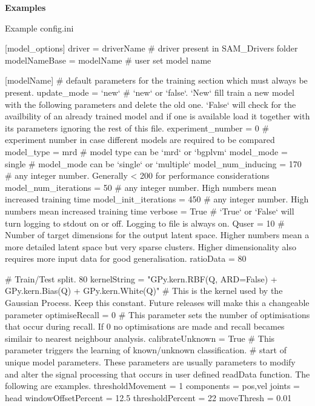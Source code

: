  {\bfseries Examples} 
\begin{DoxyCode}
Example config.ini

[model\_options]
driver = driverName \textcolor{comment}{# driver present in SAM\_Drivers folder}
modelNameBase = modelName \textcolor{comment}{# user set model name}

[modelName]
\textcolor{comment}{# default parameters for the training section which must always be present.}
update\_mode = `new` \textcolor{comment}{# `new` or `false`. `New` fill train a new model with the following parameters and
       delete the old one. `False` will check for the availbility of an already trained model and if one is available
       load it together with its parameters ignoring the rest of this file.}
experiment\_number = 0 \textcolor{comment}{# experiment number in case different models are required to be compared}
model\_type = mrd \textcolor{comment}{# model type can be `mrd` or `bgplvm`}
model\_mode = single \textcolor{comment}{# model\_mode can be `single` or `multiple`}
model\_num\_inducing = 170 \textcolor{comment}{# any integer number. Generally < 200 for performance considerations}
model\_num\_iterations = 50 \textcolor{comment}{# any integer number. High numbers mean increased training time}
model\_init\_iterations = 450 \textcolor{comment}{# any integer number. High numbers mean increased training time}
verbose = \textcolor{keyword}{True} \textcolor{comment}{# `True` or `False` will turn logging to stdout on or off. Logging to file is always on.}
Quser = 10 \textcolor{comment}{# Number of target dimensions for the output latent space. Higher numbers mean a more detailed
       latent space but very sparse clusters. Higher dimensionality also requires more input data for good
       generalisation.}
ratioData = 80 \textcolor{comment}{# Train/Test split. 80%
kernelString = \textcolor{stringliteral}{"GPy.kern.RBF(Q, ARD=False) + GPy.kern.Bias(Q) + GPy.kern.White(Q)"} \textcolor{comment}{# This is the kernel
       used by the Gaussian Process. Keep this constant. Future releases will make this a changeable parameter}
optimiseRecall = 0 \textcolor{comment}{# This parameter sets the number of optimisations that occur during recall. If 0 no
       optimisations are made and recall becames similair to nearest neighbour analysis.}
calibrateUnknown = \textcolor{keyword}{True} \textcolor{comment}{# This parameter triggers the learning of known/unknown classification.}
\textcolor{comment}{# start of unique model parameters. These parameters are usually parameters to modify and alter the signal
       processing that occurs in user defined readData function. The following are examples.}
thresholdMovement = 1
components = pos,vel
joints = head
windowOffsetPercent = 12.5
thresholdPercent = 22
moveThresh = 0.01

}
\end{DoxyCode}
